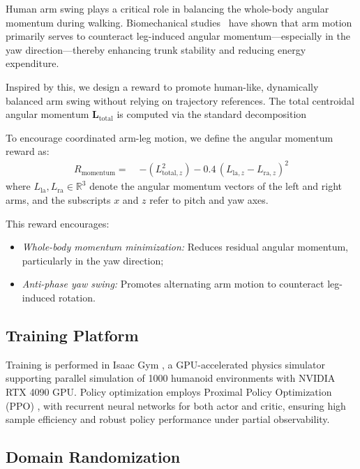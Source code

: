 \documentclass[letterpaper, 10 pt, conference]{ieeeconf}
\begin{document}
Human arm swing plays a critical role in balancing the whole-body angular momentum during walking. Biomechanical studies~\cite{collins2009dynamic, pontzer2009control, herr2008armSwing} have shown that arm motion primarily serves to counteract leg-induced angular momentum—especially in the yaw direction—thereby enhancing trunk stability and reducing energy expenditure.

Inspired by this, we design a reward to promote human-like, dynamically balanced arm swing without relying on trajectory references. The total centroidal angular momentum $\mathbf{L}_{\text{total}}$ is computed via the standard decomposition~\cite{lee2012centroidal}


To encourage coordinated arm-leg motion, we define the angular momentum reward as:
\begin{align}
R_{\text{momentum}} =\; & - \left( L_{\text{total},z}^2 \right) 
 - 0.4\, \left( L_{\text{la},z} - L_{\text{ra},z} \right)^2
\end{align}
where $L_{\text{la}}, L_{\text{ra}} \in \mathbb{R}^3$ denote the angular momentum vectors of the left and right arms, and the subscripts $x$ and $z$ refer to pitch and yaw axes.

This reward encourages:
\begin{itemize}
    \item \textit{Whole-body momentum minimization:} Reduces residual angular momentum, particularly in the yaw direction;
    \item \textit{Anti-phase yaw swing:} Promotes alternating arm motion to counteract leg-induced rotation.
\end{itemize}




\subsection{Training Platform}

Training is performed in Isaac Gym \cite{rudin2022learning}, a GPU-accelerated physics simulator supporting parallel simulation of 1000 humanoid environments with NVIDIA RTX 4090 GPU. Policy optimization employs Proximal Policy Optimization (PPO) \cite{schulman2017proximal}, with recurrent neural networks for both actor and critic, ensuring high sample efficiency and robust policy performance under partial observability.

\subsection{Domain Randomization}
\end{document}
